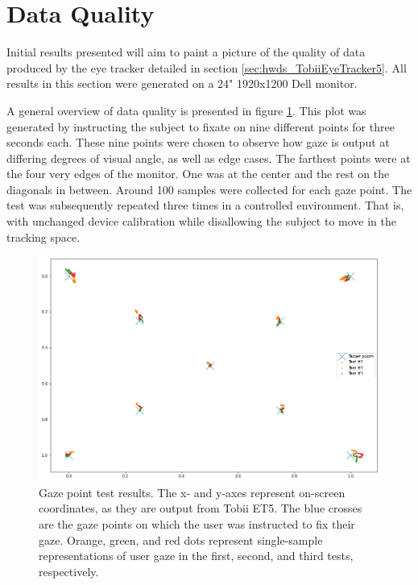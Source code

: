 \section{Data Quality} \label{sec:res_DataQuality}


Initial results presented will aim to paint a picture of the quality of data produced by the eye tracker detailed in section \ref{sec:hwds_TobiiEyeTracker5}. All results in this section were generated on a 24" 1920x1200 Dell monitor.

A general overview of data quality is presented in figure \ref{fig:res_GazePointTest}. This plot was generated by instructing the subject to fixate on nine different points for three seconds each. These nine points were chosen to observe how gaze is output at differing degrees of visual angle, as well as edge cases. The farthest points were at the four very edges of the monitor. One was at the center and the rest on the diagonals in between. Around 100 samples were collected for each gaze point. The test was subsequently repeated three times in a controlled environment. That is, with unchanged device calibration while disallowing the subject to move in the tracking space.

\begin{figure}[h]
    \centering
    \includegraphics[width=\textwidth]{Images/DataQuality/GazePointTest.png}
    \caption{Gaze point test results. The x- and y-axes represent on-screen coordinates, as they are output from Tobii ET5. The blue crosses are the gaze points on which the user was instructed to fix their gaze. Orange, green, and red dots represent single-sample representations of user gaze in the first, second, and third tests, respectively.}
    \label{fig:res_GazePointTest}
\end{figure}

